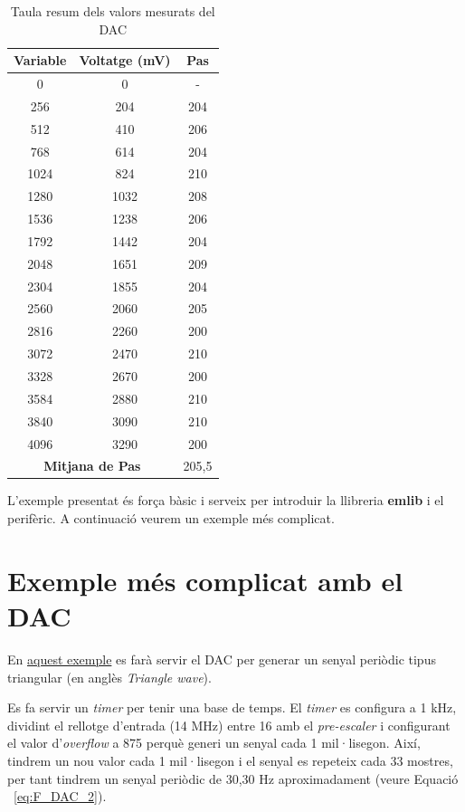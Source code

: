\begin{table}
\caption{Taula resum dels valors mesurats del DAC}
\centering
\begin{tabular}{|c|c|c|}
\hline
{\bf Variable} & {\bf Voltatge (mV)} & {\bf Pas}\\
\hline
0 & 0 & - \\
256	& 204 & 204 \\
512	& 410 & 206 \\
768	& 614 & 204 \\
1024	& 824 & 210 \\
1280	& 1032 & 208 \\
1536	& 1238 & 206 \\
1792	& 1442 & 204 \\
2048	& 1651 & 209 \\
2304	& 1855 & 204 \\
2560	& 2060 & 205 \\
2816	& 2260 & 200 \\
3072	& 2470 & 210 \\
3328	& 2670 & 200 \\
3584	& 2880 & 210 \\
3840	& 3090 & 210 \\
4096	& 3290 & 200 \\
\hline
\multicolumn{2}{|c|}{\bf Mitjana de Pas} & 205,5 \\
\hline
\end{tabular}
\label{tb:DACVoltages}
\end{table}

L'exemple presentat és força bàsic i serveix per introduir la llibreria {\bf emlib} i el perifèric. A continuació veurem un exemple més complicat.

\section{Exemple més complicat amb el DAC}
\label{sec:DAC_Example_2}
En \href{https://github.com/mariusmm/cursembedded/tree/master/Simplicity/DAC_2}{aquest exemple} es farà servir el \gls{DAC} per generar un senyal periòdic tipus triangular (en anglès {\em Triangle wave}).

Es fa servir un {\em timer} per tenir una base de temps. El {\em timer} es configura a 1 kHz, dividint el rellotge d'entrada (14 MHz) entre 16 amb el {\em pre-escaler} i configurant el valor d'{\em overflow} a 875 perquè generi un senyal cada 1 mil·lisegon. Així, tindrem un nou valor cada 1 mil·lisegon i el senyal es repeteix cada 33 mostres, per tant tindrem un senyal periòdic de 30,30 Hz aproximadament (veure Equació ~\ref{eq:F_DAC_2}).

